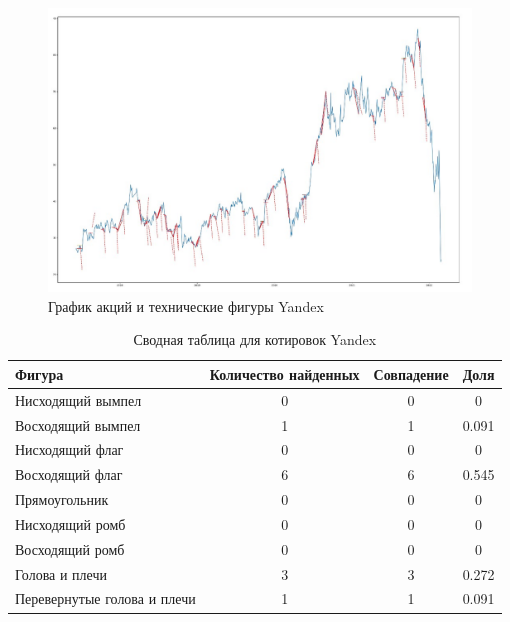 \documentclass[bachelor, och, coursework]{SCWorks}
\begin{document}
    \begin{figure}[H]
        \centering
        \includegraphics[width=\textwidth]{pic/Yandex.jpg}
        \caption{График акций и технические фигуры Yandex}
    \end{figure}
   
    \begin{table}[!hbt]
        \caption{Сводная таблица для котировок Yandex}
        \centering
        \begin{tabular}{|l|c|c|c|}
        \hline
        Фигура                      & \multicolumn{1}{l|}{Количество найденных} & Совпадение & Доля  \\ \hline
        Нисходящий вымпел           & 0                                         & 0          & 0     \\ \hline
        Восходящий вымпел           & 1                                         & 1          & 0.091 \\ \hline
        Нисходящий флаг             & 0                                         & 0          & 0     \\ \hline
        Восходящий флаг             & 6                                         & 6          & 0.545 \\ \hline
        Прямоугольник               & 0                                         & 0          & 0     \\ \hline
        Нисходящий ромб             & 0                                         & 0          & 0     \\ \hline
        Восходящий ромб             & 0                                         & 0          & 0     \\ \hline
        Голова и плечи              & 3                                         & 3          & 0.272 \\ \hline
        Перевернутые голова и плечи & 1                                         & 1          & 0.091 \\ \hline
        \end{tabular}   
    \end{table}
\end{document}
